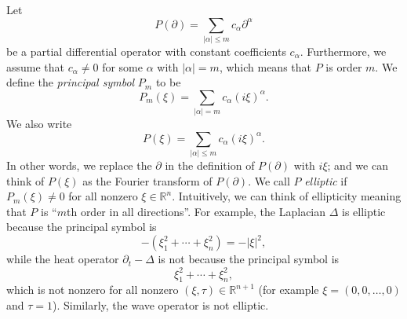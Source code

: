 \documentclass[12pt,letterpaper,reqno]{article}
\theoremstyle{plain}                              %
\theoremstyle{definition}                         %
\theoremstyle{remark}                             %
\numberwithin{equation}{section}
\newcommand{\R}{\mathbb{R}}                     %
\begin{document}
Let \[P(\partial) = \sum_{|\alpha|\le m} c_\alpha \partial^\alpha\] be a partial differential operator with constant coefficients $c_\alpha$. Furthermore, we assume that $c_\alpha \ne 0$ for some $\alpha$ with $|\alpha| = m$, which means that $P$ is order $m$. We define the \textit{principal symbol} $P_m$ to be
\[P_m(\xi) = \sum_{|\alpha| = m} c_\alpha (i\xi)^\alpha.\]
We also write
\[P(\xi) = \sum_{|\alpha| \le m} c_\alpha (i\xi)^\alpha.\]
In other words, we replace the $\partial$ in the definition of $P(\partial)$ with $i\xi$; and we can think of $P(\xi)$ as the Fourier transform of $P(\partial)$.
We call $P$ \textit{elliptic} if $P_m(\xi)\ne 0$ for all nonzero $\xi\in \R^n$. Intuitively, we can think of ellipticity meaning that $P$ is ``$m$th order in all directions''. For example, the Laplacian $\Delta$ is elliptic because the principal symbol is
\[-(\xi_1^2 + \cdots + \xi_n^2) = - |\xi|^2,\]
while the heat operator $\partial_t - \Delta$ is not because the principal symbol is
\[\xi_1^2 +\cdots + \xi_{n}^2,\]
which is not nonzero for all nonzero $(\xi,\tau)\in \R^{n+1}$ (for example $\xi = (0,0,\ldots, 0)$ and $\tau = 1$). Similarly, the wave operator is not elliptic.
\end{document}
